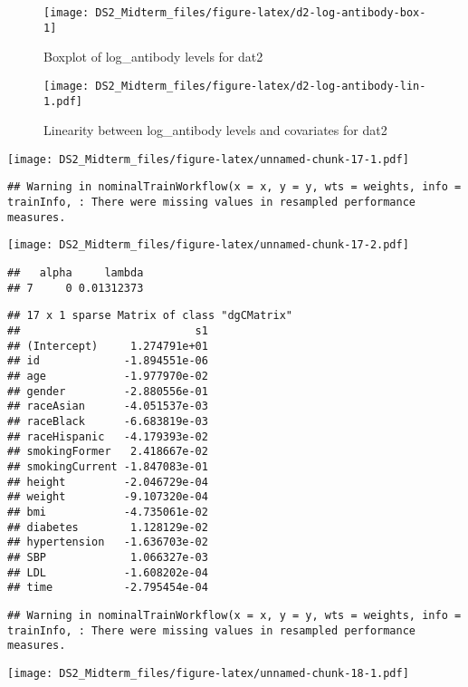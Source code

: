 \documentclass[
]{article}
\begin{document}
\begin{figure}

{\centering \texttt{[image: DS2\_Midterm\_files/figure-latex/d2-log-antibody-box-1]} 

}

\caption{Boxplot of log\_antibody levels for dat2}\label{fig:d2-log-antibody-box}
\end{figure}

\begin{figure}
\centering
\texttt{[image: DS2\_Midterm\_files/figure-latex/d2-log-antibody-lin-1.pdf]}
\caption{\label{fig:d2-log-antibody-lin}Linearity between log\_antibody levels and covariates for dat2}
\end{figure}

\texttt{[image: DS2\_Midterm\_files/figure-latex/unnamed-chunk-17-1.pdf]}

\begin{verbatim}
## Warning in nominalTrainWorkflow(x = x, y = y, wts = weights, info = trainInfo, : There were missing values in resampled performance measures.
\end{verbatim}

\texttt{[image: DS2\_Midterm\_files/figure-latex/unnamed-chunk-17-2.pdf]}

\begin{verbatim}
##   alpha     lambda
## 7     0 0.01312373
\end{verbatim}

\begin{verbatim}
## 17 x 1 sparse Matrix of class "dgCMatrix"
##                           s1
## (Intercept)     1.274791e+01
## id             -1.894551e-06
## age            -1.977970e-02
## gender         -2.880556e-01
## raceAsian      -4.051537e-03
## raceBlack      -6.683819e-03
## raceHispanic   -4.179393e-02
## smokingFormer   2.418667e-02
## smokingCurrent -1.847083e-01
## height         -2.046729e-04
## weight         -9.107320e-04
## bmi            -4.735061e-02
## diabetes        1.128129e-02
## hypertension   -1.636703e-02
## SBP             1.066327e-03
## LDL            -1.608202e-04
## time           -2.795454e-04
\end{verbatim}

\begin{verbatim}
## Warning in nominalTrainWorkflow(x = x, y = y, wts = weights, info = trainInfo, : There were missing values in resampled performance measures.
\end{verbatim}

\texttt{[image: DS2\_Midterm\_files/figure-latex/unnamed-chunk-18-1.pdf]}
\end{document}
